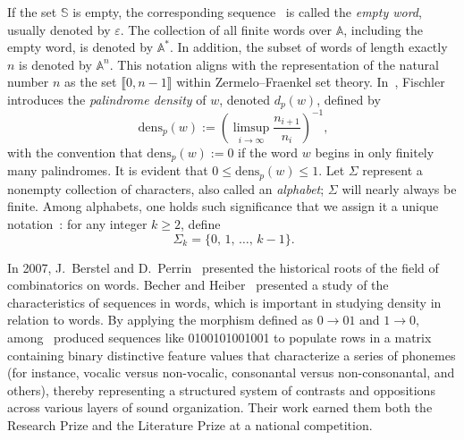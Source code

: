 \documentclass[12pt]{amsart}
\begin{document}
If the set $\mathbb{S}$ is empty, the corresponding sequence~\cite{Rigo2014} is called the \emph{empty word}, usually denoted by $\varepsilon$. 
The collection of all finite words over $\mathbb{A}$, including the empty word, is denoted by $\mathbb{A}^*$. 
In addition, the subset of words of length exactly $n$ is denoted by $\mathbb{A}^n$. 
This notation aligns with the representation of the natural number $n$ as the set $\llbracket 0, n-1 \rrbracket$ within Zermelo–Fraenkel set theory. In~\cite{Fischler2013}, Fischler introduces the \emph{palindrome density} of $w$, denoted $d_p(w)$, defined by
\begin{equation}~\label{eqqintron1}
\mathrm{dens}_p(w) := \left( \limsup_{i \to \infty} \frac{n_{i+1}}{n_i} \right)^{-1},
\end{equation}
with the convention that $\mathrm{dens}_p(w):= 0$ if the word $w$ begins in only finitely many palindromes. It is evident that $0 \leq \mathrm{dens}_p(w) \leq 1.$ Let $\Sigma$ represent a nonempty collection of characters, also called an \emph{alphabet}; $\Sigma$ will nearly always be finite. Among alphabets, one holds such significance that we assign it a unique notation~\cite{Allouche2003Shallit}: for any integer $k \geq 2$, define
\begin{equation}~\label{eqqintron2}
 \Sigma_k = \{ 0,\,1,\,\ldots,\,k-1 \}.
\end{equation}

In 2007, J.~Berstel and D.~Perrin~\cite{Berstel2007Perrin} presented the historical roots of the field of combinatorics on words. Becher and Heiber~\cite{Becher2011Heiber} presented a study of the characteristics of sequences in words, which is important in studying density in relation to words. By applying the morphism defined as $0 \to 01$ and $1\to 0$, among~\cite{Brlek2018Chemillier} produced sequences like 0100101001001 to populate rows in a matrix containing binary distinctive feature values that characterize a series of phonemes (for instance, vocalic versus non-vocalic, consonantal versus non-consonantal, and others), thereby representing a structured system of contrasts and oppositions across various layers of sound organization. Their work earned them both the Research Prize and the Literature Prize at a national competition.

\end{document}
